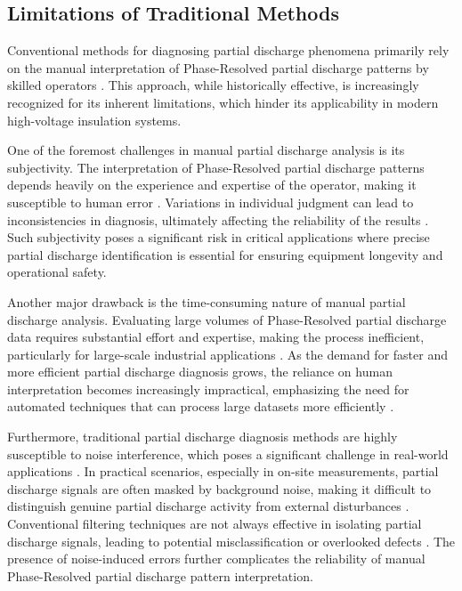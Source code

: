 \subsection{Limitations of Traditional Methods}
\label{sec:limitations_traditional}

Conventional methods for diagnosing partial discharge phenomena primarily rely on the manual interpretation of Phase-Resolved partial discharge patterns by skilled operators \parencite{Kasinathan_2017, Florkowski_2021}. This approach, while historically effective, is increasingly recognized for its inherent limitations, which hinder its applicability in modern high-voltage insulation systems.

One of the foremost challenges in manual partial discharge analysis is its subjectivity. The interpretation of Phase-Resolved partial discharge patterns depends heavily on the experience and expertise of the operator, making it susceptible to human error \parencite{Masud_2016, Lu_2020_2}. Variations in individual judgment can lead to inconsistencies in diagnosis, ultimately affecting the reliability of the results \parencite{Kunicki_2018}. Such subjectivity poses a significant risk in critical applications where precise partial discharge identification is essential for ensuring equipment longevity and operational safety.

Another major drawback is the time-consuming nature of manual partial discharge analysis. Evaluating large volumes of Phase-Resolved partial discharge data requires substantial effort and expertise, making the process inefficient, particularly for large-scale industrial applications \parencite{Long_2024}. As the demand for faster and more efficient partial discharge diagnosis grows, the reliance on human interpretation becomes increasingly impractical, emphasizing the need for automated techniques that can process large datasets more efficiently \parencite{Das_2023}.

Furthermore, traditional partial discharge diagnosis methods are highly susceptible to noise interference, which poses a significant challenge in real-world applications \parencite{Friebe_2024}. In practical scenarios, especially in on-site measurements, partial discharge signals are often masked by background noise, making it difficult to distinguish genuine partial discharge activity from external disturbances \parencite{Ghosh_2020, Bao_2024}. Conventional filtering techniques are not always effective in isolating partial discharge signals, leading to potential misclassification or overlooked defects \parencite{Hussein_2016}. The presence of noise-induced errors further complicates the reliability of manual Phase-Resolved partial discharge pattern interpretation.

